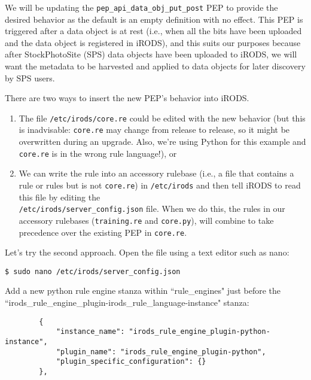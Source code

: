 \documentclass[10pt,oneside]{memoir}
\begin{document}
\vspace{5mm}
\begin{lrbox}{\lstPythonRulebase}

\end{lrbox}
\href{https://raw.githubusercontent.com/irods/irods_training/ugm2024/beginner/core.py}{\usebox{\lstPythonRulebase}}

We will be updating the \texttt{pep\_api\_data\_obj\_put\_post} PEP to provide the desired behavior as the default is an empty definition with no effect.  This PEP is triggered after a data object is at rest (i.e., when all the bits have been uploaded and the data object is registered in iRODS), and this suits our purposes because after StockPhotoSite (SPS) data objects have been uploaded to iRODS, we will want the metadata to be harvested and applied to data objects for later discovery by SPS users.

There are two ways to insert the new PEP's behavior into iRODS.
\begin{enumerate}
 \item The file \texttt{/etc/irods/core.re} could be edited with the new behavior (but this is inadvisable: \texttt{core.re} may change from release to release, so it might be overwritten during an upgrade.  Also, we're using Python for this example and \texttt{core.re} is in the wrong rule language!), or
 \item We can write the rule into an accessory rulebase (i.e., a file that contains a rule or rules but is not \texttt{core.re}) in \texttt{/etc/irods} and then tell iRODS to read this file by editing the \\ \texttt{/etc/irods/server\_config.json} file. When we do this, the rules in our accessory rulebases (\texttt{training.re} and \texttt{core.py}), will combine to take precedence over the existing PEP in \texttt{core.re}.
\end{enumerate}

Let's try the second approach. Open the file using a text editor such as nano:

\begin{lstlisting}
$ sudo nano /etc/irods/server_config.json
\end{lstlisting}

Add a new python rule engine stanza within ``rule\_engines" just before the ``irods\_rule\_engine\_plugin-irods\_rule\_language-instance" stanza:

\begin{lrbox}{\lstServerConfigA}
\begin{lstlisting}
        {
            "instance_name": "irods_rule_engine_plugin-python-instance",
            "plugin_name": "irods_rule_engine_plugin-python",
            "plugin_specific_configuration": {}
        },
\end{lstlisting}
\end{lrbox}
\href{https://github.com/irods/irods_training/blob/ugm2024/beginner/server_config.json#L41-L45}{\usebox{\lstServerConfigA}}
\end{document}
